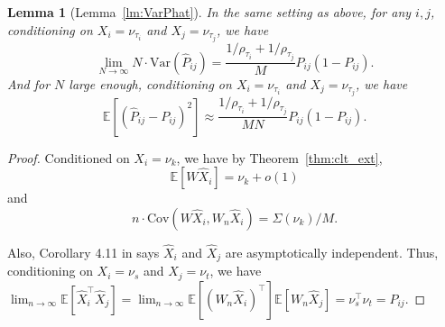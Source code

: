 \documentclass[10pt,letterpaper]{article}
\newtheorem{lemma}[fact]{Lemma}
\newcommand{\Ex}{\mathbb{E}}
\renewcommand{\hat}{\widehat}
\begin{document}
\begin{lemma}[Lemma~\ref{lm:VarPhat}]
In the same setting as above, for any $i, j$, conditioning on $X_i = \nu_{\tau_i}$ and $X_j = \nu_{\tau_j}$, we have
\[
	\lim_{N \to \infty} N \cdot \mathrm{Var}(\hat{P}_{ij}) =
    \frac{1/\rho_{\tau_i} + 1/\rho_{\tau_j}}{M} P_{ij} (1 - P_{ij}).
\]
And for $N$ large enough, conditioning on $X_i = \nu_{\tau_i}$ and $X_j = \nu_{\tau_j}$, we have
\[
	\Ex[(\hat{P}_{ij} - P_{ij})^2] \approx
    \frac{1/\rho_{\tau_i} + 1/\rho_{\tau_j}}{M N} P_{ij}(1-P_{ij}).
\]
\end{lemma}
\begin{proof}
Conditioned on $X_i = \nu_k$, we have by Theorem~\ref{thm:clt_ext},
\[
	\Ex[W \hat{X}_i] = \nu_k+o(1)
\]
and
\[
	n \cdot \mathrm{Cov}(W \hat{X}_i, W_n \hat{X}_i) = \Sigma(\nu_k)/M.
\]


Also, Corollary 4.11 in \citet{athreya2013limit} says $\hat{X}_i$ and $\hat{X}_j$ are asymptotically independent. Thus, conditioning on $X_i = \nu_s$ and $X_j = \nu_t$, we have $\lim_{n\to\infty}\Ex[\hat{X}_i^{\top} \hat{X}_j] = \lim_{n\to\infty}\Ex[(W_n \hat{X}_i)^{\top}] \Ex[W_n \hat{X}_j] = \nu_s^{\top} \nu_t = P_{ij}$.


\end{proof}
\end{document}
